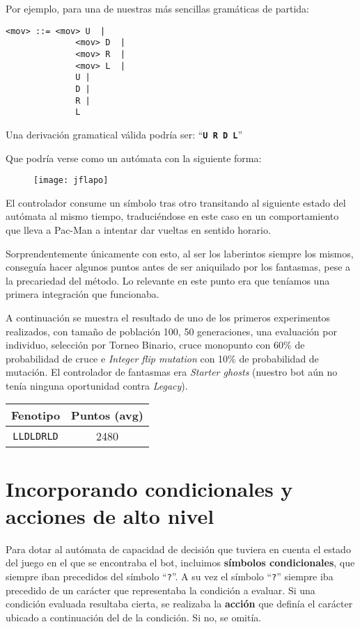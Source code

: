 Por ejemplo, para una de nuestras más sencillas gramáticas de partida:
\begin{lstlisting}[frame=single, breaklines=no, basicstyle=\fontsize{10}{11}\ttfamily]
    <mov> ::= <mov> U  | 
              <mov> D  | 
              <mov> R  | 
              <mov> L  |
              U | 
              D | 
              R |
              L
\end{lstlisting}

Una derivación gramatical válida podría ser:
``\textbf{\texttt{U R D L}}''

Que podría verse como un autómata con la siguiente forma\cite{jflapPage}:
\begin{figure}[H]
\centering
\texttt{[image: jflapo]}
\end{figure}

El controlador consume un símbolo tras otro transitando al siguiente estado del autómata al mismo tiempo, traduciéndose en este caso en un comportamiento que lleva a Pac-Man a intentar dar vueltas en sentido horario.
 
Sorprendentemente únicamente con esto, al ser los laberintos siempre los mismos, conseguía hacer algunos puntos antes de ser aniquilado por los fantasmas, pese a la precariedad del método. Lo relevante en este punto era que teníamos una primera integración que funcionaba.
 
A continuación se muestra el resultado de uno de los primeros experimentos realizados, con tamaño de población 100, 50 generaciones, una evaluación por individuo, selección por Torneo Binario, cruce monopunto con 60\% de probabilidad de cruce e \textit{Integer flip mutation} con 10\% de probabilidad de mutación. El controlador de fantasmas era \textit{Starter ghosts} (nuestro bot aún no tenía ninguna oportunidad contra \textit{Legacy}).
\begin{table}[H]
\centering
\begin{tabular}{cc}
\hline
\textbf{Fenotipo} & \textbf{Puntos (avg)} \\ \hline
\texttt{LLDLDRLD}          & 2480                  \\ \hline
\end{tabular}
\end{table}

\section{Incorporando condicionales y acciones de alto nivel}
Para dotar al autómata de capacidad de decisión que tuviera en cuenta el estado del juego en el que se encontraba el bot, incluimos \textbf{símbolos condicionales}, que siempre iban precedidos del símbolo ``\texttt{?}''. A su vez el símbolo ``\texttt{?}'' siempre iba precedido de un carácter que representaba la condición a evaluar.
Si una condición evaluada resultaba cierta, se realizaba la \textbf{acción} que definía el carácter ubicado a continuación del de la condición. Si no, se omitía. 


